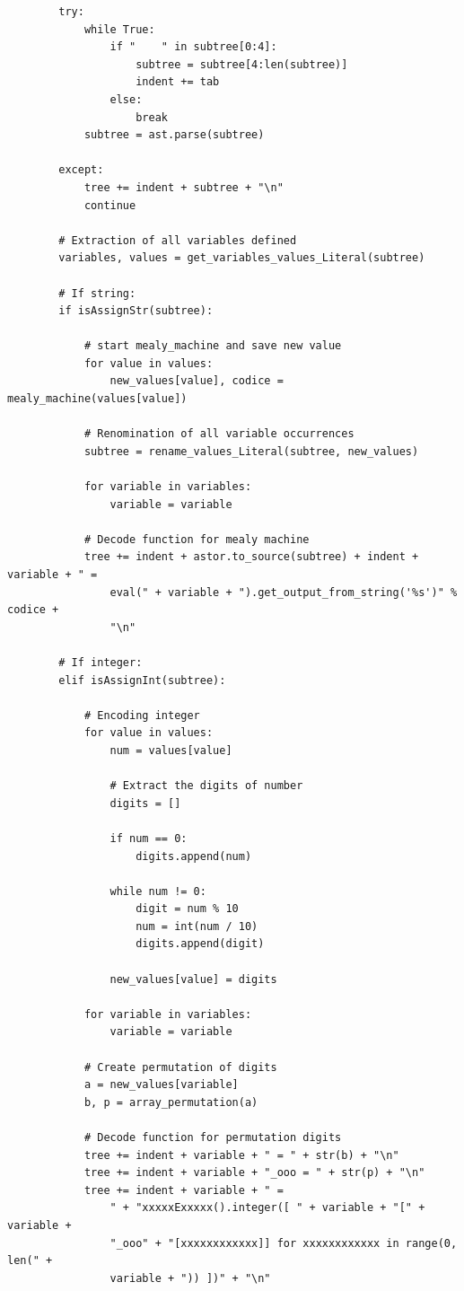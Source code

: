 \documentclass[a4paper,oneside,openright,titlepage,10pt,footinclude,headinclude]{scrbook}
\begin{document}
\begin{graybox}[innerleftmargin=2,]
\begin{lstlisting}
        try:
            while True:
                if "    " in subtree[0:4]:
                    subtree = subtree[4:len(subtree)]
                    indent += tab
                else:
                    break
            subtree = ast.parse(subtree)

        except:
            tree += indent + subtree + "\n"
            continue

        # Extraction of all variables defined
        variables, values = get_variables_values_Literal(subtree)

        # If string:
        if isAssignStr(subtree):

            # start mealy_machine and save new value
            for value in values:
                new_values[value], codice = mealy_machine(values[value])

            # Renomination of all variable occurrences
            subtree = rename_values_Literal(subtree, new_values)

            for variable in variables:
                variable = variable

            # Decode function for mealy machine
            tree += indent + astor.to_source(subtree) + indent + variable + " = 
                eval(" + variable + ").get_output_from_string('%s')" % codice + 
                "\n"

        # If integer:
        elif isAssignInt(subtree):

            # Encoding integer
            for value in values:
                num = values[value]

                # Extract the digits of number
                digits = []

                if num == 0:
                    digits.append(num)

                while num != 0:
                    digit = num % 10
                    num = int(num / 10)
                    digits.append(digit)

                new_values[value] = digits

            for variable in variables:
                variable = variable

            # Create permutation of digits
            a = new_values[variable]
            b, p = array_permutation(a)

            # Decode function for permutation digits
            tree += indent + variable + " = " + str(b) + "\n"
            tree += indent + variable + "_ooo = " + str(p) + "\n"
            tree += indent + variable + " = 
                " + "xxxxxExxxxx().integer([ " + variable + "[" + variable + 
                "_ooo" + "[xxxxxxxxxxxx]] for xxxxxxxxxxxx in range(0, len(" + 
                variable + ")) ])" + "\n"


\end{lstlisting}
\end{graybox}
\end{document}

